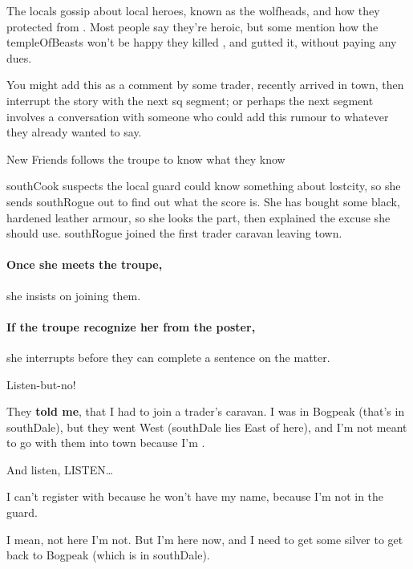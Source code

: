 The locals gossip about local heroes, known as the \glspl{wolfhead}, and how they protected  from .
Most people say they're heroic, but some mention how the \gls{templeOfBeasts} won't be happy they killed , and gutted it, without paying any dues.

You might add this as a comment by some trader, recently arrived in town, then interrupt the story with the next \gls{sq} \gls{segment}; or perhaps the next \gls{segment} involves a conversation with someone who could add this rumour to whatever they already wanted to say.

{New Friends}%
{ follows the troupe to know what they know}%

\Gls{southCook} suspects the local \gls{guard} could know something about \gls{lostcity}, so she sends \gls{southRogue} out to find out what the score is.
She has bought  some black, hardened leather armour, so she looks the part, then explained the excuse she should use.
\Gls{southRogue} joined the first trader caravan leaving \gls{town}.

\paragraph{Once she meets the troupe,}
she insists on joining them.

\paragraph{If the troupe recognize her from the poster,}
she interrupts before they can complete a sentence on the matter.

\begin{exampletext}
  Listen-but-no!
  
  They \textbf {told me}, that I had to join a trader's caravan.
  I was in Bogpeak (that's in \gls{southDale}), but they went West (\gls{southDale} lies East of here), and I'm not meant to go with them into \gls{town} because I'm .
  
  And listen, LISTEN\ldots

  I can't register with  because he won't have my name, because I'm not in the \gls{guard}.

  I mean, not here I'm not.
  But I'm here now, and I need to get some silver to get back to Bogpeak (which is in \gls{southDale}).
\end{exampletext}

